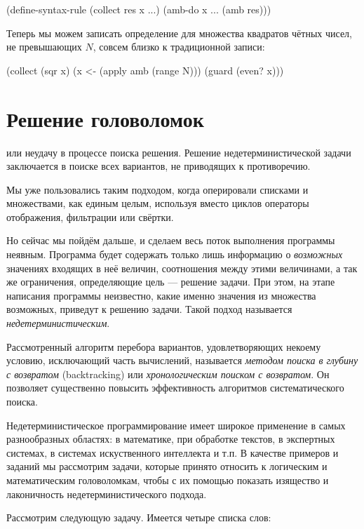 \begin{Definition}[emph={x,res}]
(define-syntax-rule (collect res x ...)
  (amb-do x ... (amb res)))
\end{Definition}
Теперь мы можем записать определение для множества квадратов чётных чисел, не превышающих $N$, совсем близко к традиционной записи:
\begin{SchemeCode}[emph={x,N}]
  (collect (sqr x) (x <- (apply amb (range N))) (guard (even? x)))
\end{SchemeCode}

\section[2]{Решение головоломок}%

 или неудачу в процессе поиска решения. Решение недетерминистической задачи заключается в поиске всех вариантов, не приводящих к противоречию.


Мы уже пользовались таким подходом, когда оперировали списками и множествами, как единым целым, используя вместо циклов операторы отображения, фильтрации или свёртки. 

Но сейчас мы пойдём дальше, и сделаем весь поток выполнения программы неявным. Программа будет содержать только лишь информацию о \emph{возможных} значениях входящих в неё величин, соотношения между этими величинами, а так же ограничения, определяющие цель --- решение задачи. При этом, на этапе написания программы неизвестно, какие именно значения из множества возможных, приведут к решению задачи. Такой подход называется \emph{недетерминистическим}.

Рассмотренный алгоритм перебора вариантов, удовлетворяющих некоему условию, исключающий часть вычислений, называется \emph{методом поиска в глубину с возвратом} (backtracking) или \emph{хронологическим поиском с возвратом}. Он позволяет существенно повысить эффективность алгоритмов систематического поиска.


Недетерминистическое программирование имеет широкое применение в самых разнообразных областях: в математике, при обработке текстов, в экспертных системах, в системах искуственного интеллекта и т.п. В качестве примеров и заданий мы рассмотрим задачи, которые принято относить к логическим и математическим головоломкам, чтобы с их помощью показать изящество и лаконичность недетерминистического подхода.

Рассмотрим следующую задачу. Имеется четыре списка слов:

